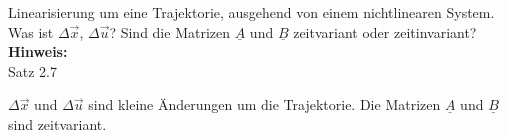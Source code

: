 \begin{question}[section=2,name={Linearisierung um eine Trajektorie},difficulty=6,type=mdl,tags={}]
	Linearisierung um eine Trajektorie, ausgehend von einem nichtlinearen System. Was ist $\Delta \vec x$, $\Delta \vec u$? Sind die Matrizen $\underline A$ und $\underline B$ zeitvariant oder zeitinvariant?
	\\ \textbf{Hinweis:}\\
	Satz 2.7
\end{question}
\begin{solution}
	$\Delta \vec x$ und $\Delta \vec u$ sind kleine Änderungen um die Trajektorie. Die Matrizen $\underline A$ und $\underline B$ sind zeitvariant.
\end{solution}